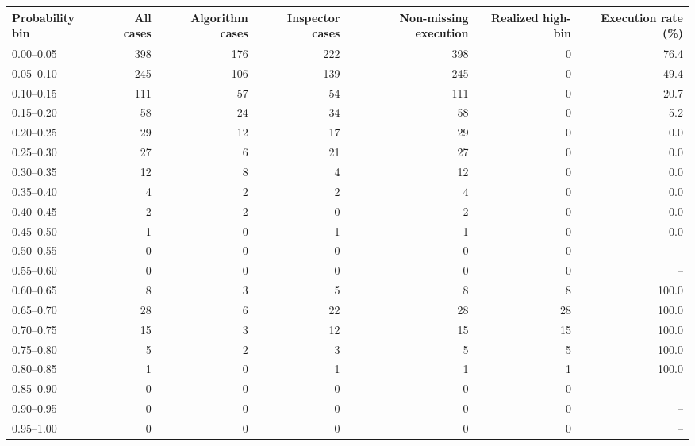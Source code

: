 \begin{tabular}[t]{lrrrrrr}
\toprule
Probability bin & All cases & Algorithm cases & Inspector cases & Non-missing execution & Realized high-bin & Execution rate (\%)\\
\midrule
0.00--0.05 & 398 & 176 & 222 & 398 & 0 & 76.4\\
0.05--0.10 & 245 & 106 & 139 & 245 & 0 & 49.4\\
0.10--0.15 & 111 & 57 & 54 & 111 & 0 & 20.7\\
0.15--0.20 & 58 & 24 & 34 & 58 & 0 & 5.2\\
0.20--0.25 & 29 & 12 & 17 & 29 & 0 & 0.0\\
0.25--0.30 & 27 & 6 & 21 & 27 & 0 & 0.0\\
0.30--0.35 & 12 & 8 & 4 & 12 & 0 & 0.0\\
0.35--0.40 & 4 & 2 & 2 & 4 & 0 & 0.0\\
0.40--0.45 & 2 & 2 & 0 & 2 & 0 & 0.0\\
0.45--0.50 & 1 & 0 & 1 & 1 & 0 & 0.0\\
0.50--0.55 & 0 & 0 & 0 & 0 & 0 & --\\
0.55--0.60 & 0 & 0 & 0 & 0 & 0 & --\\
0.60--0.65 & 8 & 3 & 5 & 8 & 8 & 100.0\\
0.65--0.70 & 28 & 6 & 22 & 28 & 28 & 100.0\\
0.70--0.75 & 15 & 3 & 12 & 15 & 15 & 100.0\\
0.75--0.80 & 5 & 2 & 3 & 5 & 5 & 100.0\\
0.80--0.85 & 1 & 0 & 1 & 1 & 1 & 100.0\\
0.85--0.90 & 0 & 0 & 0 & 0 & 0 & --\\
0.90--0.95 & 0 & 0 & 0 & 0 & 0 & --\\
0.95--1.00 & 0 & 0 & 0 & 0 & 0 & --\\
\bottomrule
\end{tabular}
